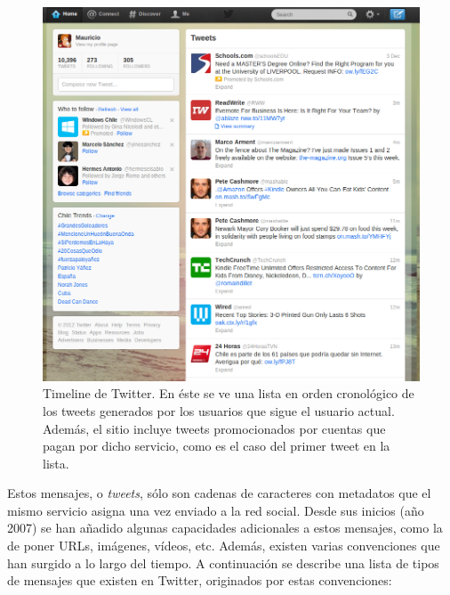 \documentclass[upright, contnum]{umemoria}
\begin{document}
\begin{figure}[h!b]
  \centering
  \includegraphics[width=12cm]{./img/twitter.png}
  \caption[Timeline de Twitter.]
   {Timeline de Twitter. En éste se ve una lista en orden cronológico
  de los tweets generados por los usuarios que sigue el usuario
  actual. Además, el sitio incluye tweets promocionados por cuentas
  que pagan por dicho servicio, como es el caso del primer tweet en la
  lista.}
\end{figure}
   
   Estos mensajes, o \emph{tweets}, sólo son cadenas de caracteres con
   metadatos que el mismo servicio asigna una vez enviado a la red
   social. Desde sus inicios (año 2007) se han añadido algunas capacidades
   adicionales a estos mensajes, como la de poner URLs, imágenes,
   vídeos, etc. Además, existen varias convenciones que han surgido a
   lo largo del tiempo. A continuación se describe una lista de tipos
   de mensajes que existen en Twitter, originados por estas convenciones:
\end{document}
